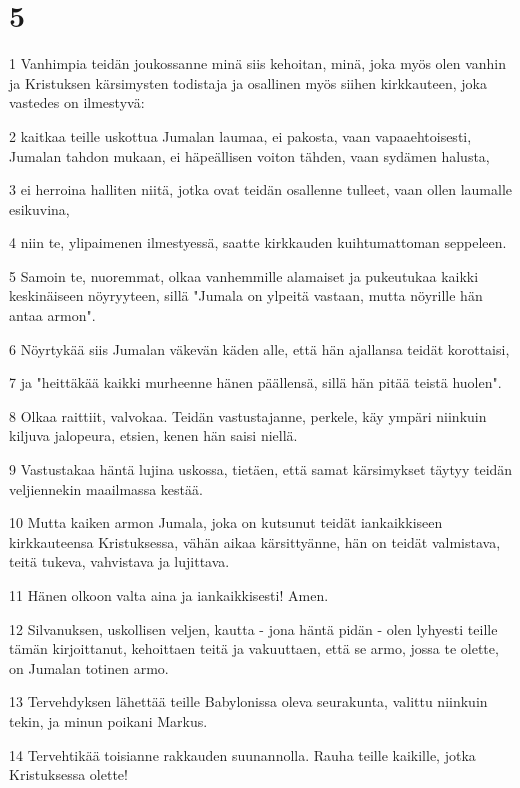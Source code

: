 \chapter{5}

\par 1 Vanhimpia teidän joukossanne minä siis kehoitan, minä, joka myös olen vanhin ja Kristuksen kärsimysten todistaja ja osallinen myös siihen kirkkauteen, joka vastedes on ilmestyvä:
\par 2 kaitkaa teille uskottua Jumalan laumaa, ei pakosta, vaan vapaaehtoisesti, Jumalan tahdon mukaan, ei häpeällisen voiton tähden, vaan sydämen halusta,
\par 3 ei herroina halliten niitä, jotka ovat teidän osallenne tulleet, vaan ollen laumalle esikuvina,
\par 4 niin te, ylipaimenen ilmestyessä, saatte kirkkauden kuihtumattoman seppeleen.
\par 5 Samoin te, nuoremmat, olkaa vanhemmille alamaiset ja pukeutukaa kaikki keskinäiseen nöyryyteen, sillä "Jumala on ylpeitä vastaan, mutta nöyrille hän antaa armon".
\par 6 Nöyrtykää siis Jumalan väkevän käden alle, että hän ajallansa teidät korottaisi,
\par 7 ja "heittäkää kaikki murheenne hänen päällensä, sillä hän pitää teistä huolen".
\par 8 Olkaa raittiit, valvokaa. Teidän vastustajanne, perkele, käy ympäri niinkuin kiljuva jalopeura, etsien, kenen hän saisi niellä.
\par 9 Vastustakaa häntä lujina uskossa, tietäen, että samat kärsimykset täytyy teidän veljiennekin maailmassa kestää.
\par 10 Mutta kaiken armon Jumala, joka on kutsunut teidät iankaikkiseen kirkkauteensa Kristuksessa, vähän aikaa kärsittyänne, hän on teidät valmistava, teitä tukeva, vahvistava ja lujittava.
\par 11 Hänen olkoon valta aina ja iankaikkisesti! Amen.
\par 12 Silvanuksen, uskollisen veljen, kautta - jona häntä pidän - olen lyhyesti teille tämän kirjoittanut, kehoittaen teitä ja vakuuttaen, että se armo, jossa te olette, on Jumalan totinen armo.
\par 13 Tervehdyksen lähettää teille Babylonissa oleva seurakunta, valittu niinkuin tekin, ja minun poikani Markus.
\par 14 Tervehtikää toisianne rakkauden suunannolla. Rauha teille kaikille, jotka Kristuksessa olette!


